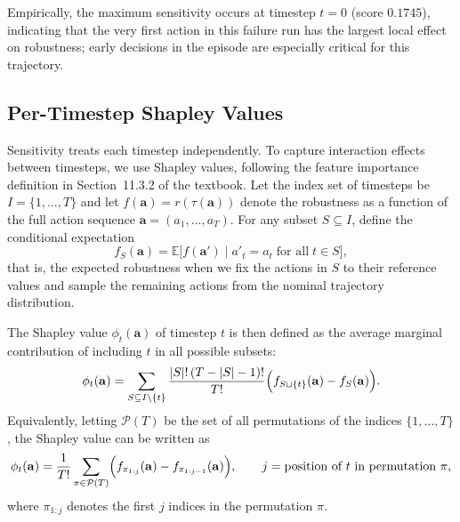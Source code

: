 \documentclass[11pt]{article}
\begin{document}
Empirically, the maximum sensitivity occurs at timestep $t=0$ (score
$0.1745$), indicating that the very first action in this failure run has the
largest local effect on robustness; early decisions in the episode are
especially critical for this trajectory.

\subsection{Per-Timestep Shapley Values}

Sensitivity treats each timestep independently. To capture interaction effects
between timesteps, we use Shapley values, following the feature importance
definition in Section~11.3.2 of the textbook. Let the index set of timesteps be
$I = \{1,\dots,T\}$ and let $f(\mathbf{a}) = r(\tau(\mathbf{a}))$ denote the
robustness as a function of the full action sequence
$\mathbf{a} = (a_1,\dots,a_T)$. For any subset $S \subseteq I$, define
the conditional expectation
\begin{equation}
  f_S(\mathbf{a})
  = \mathbb{E}\bigl[f(\mathbf{a}') \mid a'_t = a_t \;\text{for all}\; t \in S\bigr],
\end{equation}
that is, the expected robustness when we fix the actions in $S$ to their
reference values and sample the remaining actions from the nominal trajectory
distribution.

The Shapley value $\phi_t(\mathbf{a})$ of timestep $t$ is then defined as the
average marginal contribution of including $t$ in all possible subsets:
\begin{equation}
  \phi_t(\mathbf{a})
  =
  \sum_{S \subseteq I \setminus \{t\}}
   \frac{|S|!\,(T-|S|-1)!}{T!}
   \Bigl(
     f_{S \cup \{t\}}(\mathbf{a}) - f_S(\mathbf{a})
   \Bigr).
  \label{eq:shapley-def}
\end{equation}
Equivalently, letting $\mathcal{P}(T)$ be the set of all permutations of the
indices $\{1,\dots,T\}$, the Shapley value can be written as
\begin{equation}
  \phi_t(\mathbf{a})
  =
  \frac{1}{T!}
  \sum_{\pi \in \mathcal{P}(T)}
    \Bigl(
      f_{\pi_{1:j}}(\mathbf{a}) - f_{\pi_{1:j-1}}(\mathbf{a})
    \Bigr),
  \qquad
  j = \text{position of } t \text{ in permutation } \pi,
  \label{eq:shapley-perm}
\end{equation}
where $\pi_{1:j}$ denotes the first $j$ indices in the permutation $\pi$.
\end{document}
